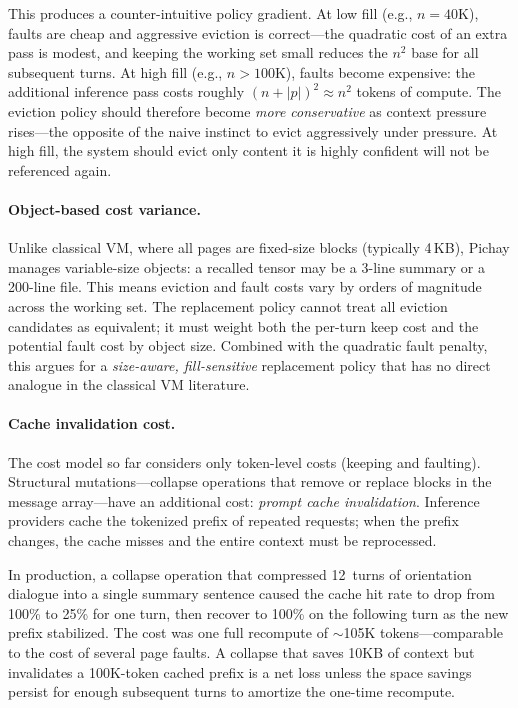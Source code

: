This produces a counter-intuitive policy gradient. At low fill
(e.g., $n = 40\text{K}$), faults are cheap and aggressive eviction is
correct---the quadratic cost of an extra pass is modest, and keeping
the working set small reduces the $n^2$ base for all subsequent turns.
At high fill (e.g., $n > 100\text{K}$), faults become expensive: the
additional inference pass costs roughly $(n + |p|)^2 \approx n^2$
tokens of compute. The eviction policy should therefore become
\emph{more conservative} as context pressure rises---the opposite of
the naive instinct to evict aggressively under pressure. At high
fill, the system should evict only content it is highly confident will
not be referenced again.

\paragraph{Object-based cost variance.}
Unlike classical VM, where all pages are fixed-size blocks (typically
4\,KB), Pichay manages variable-size objects: a recalled tensor may be
a 3-line summary or a 200-line file. This means eviction and fault
costs vary by orders of magnitude across the working set. The
replacement policy cannot treat all eviction candidates as equivalent;
it must weight both the per-turn keep cost and the potential fault cost
by object size. Combined with the quadratic fault penalty, this argues
for a \emph{size-aware, fill-sensitive} replacement policy that has no
direct analogue in the classical VM literature.

\paragraph{Cache invalidation cost.}
The cost model so far considers only token-level costs (keeping and
faulting). Structural mutations---collapse operations that remove or
replace blocks in the message array---have an additional cost:
\emph{prompt cache invalidation}. Inference providers cache the
tokenized prefix of repeated requests; when the prefix changes, the
cache misses and the entire context must be reprocessed.

In production, a collapse operation that compressed 12~turns of
orientation dialogue into a single summary sentence caused the cache
hit rate to drop from 100\% to 25\% for one turn, then recover to
100\% on the following turn as the new prefix stabilized. The cost
was one full recompute of $\sim$105K tokens---comparable to the
cost of several page faults. A collapse that saves 10KB of context
but invalidates a 100K-token cached prefix is a net loss unless the
space savings persist for enough subsequent turns to amortize the
one-time recompute.

